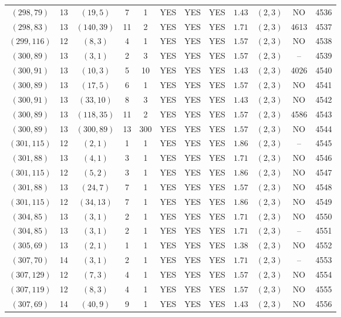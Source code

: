 \begin{longtable}{|c|c|c|c|c|c|c|c|c|c|c|c|}
$(298,79)$ & 13 & $(19,5)$ & 7 & 1 & YES & YES & YES & $1.43$ & $(2,3)$ & NO & 4536\\
$(298,83)$ & 13 & $(140,39)$ & 11 & 2 & YES & YES & YES & $1.71$ & $(2,3)$ & 4613 & 4537\\
$(299,116)$ & 12 & $(8,3)$ & 4 & 1 & YES & YES & YES & $1.57$ & $(2,3)$ & NO & 4538\\
$(300,89)$ & 13 & $(3,1)$ & 2 & 3 & YES & YES & YES & $1.57$ & $(2,3)$ & -- & 4539\\
$(300,91)$ & 13 & $(10,3)$ & 5 & 10 & YES & YES & YES & $1.43$ & $(2,3)$ & 4026 & 4540\\
$(300,89)$ & 13 & $(17,5)$ & 6 & 1 & YES & YES & YES & $1.57$ & $(2,3)$ & NO & 4541\\
$(300,91)$ & 13 & $(33,10)$ & 8 & 3 & YES & YES & YES & $1.43$ & $(2,3)$ & NO & 4542\\
$(300,89)$ & 13 & $(118,35)$ & 11 & 2 & YES & YES & YES & $1.57$ & $(2,3)$ & 4586 & 4543\\
$(300,89)$ & 13 & $(300,89)$ & 13 & 300 & YES & YES & YES & $1.57$ & $(2,3)$ & NO & 4544\\
$(301,115)$ & 12 & $(2,1)$ & 1 & 1 & YES & YES & YES & $1.86$ & $(2,3)$ & -- & 4545\\
$(301,88)$ & 13 & $(4,1)$ & 3 & 1 & YES & YES & YES & $1.71$ & $(2,3)$ & NO & 4546\\
$(301,115)$ & 12 & $(5,2)$ & 3 & 1 & YES & YES & YES & $1.86$ & $(2,3)$ & NO & 4547\\
$(301,88)$ & 13 & $(24,7)$ & 7 & 1 & YES & YES & YES & $1.57$ & $(2,3)$ & NO & 4548\\
$(301,115)$ & 12 & $(34,13)$ & 7 & 1 & YES & YES & YES & $1.86$ & $(2,3)$ & NO & 4549\\
$(304,85)$ & 13 & $(3,1)$ & 2 & 1 & YES & YES & YES & $1.71$ & $(2,3)$ & NO & 4550\\
$(304,85)$ & 13 & $(3,1)$ & 2 & 1 & YES & YES & YES & $1.71$ & $(2,3)$ & -- & 4551\\
$(305,69)$ & 13 & $(2,1)$ & 1 & 1 & YES & YES & YES & $1.38$ & $(2,3)$ & NO & 4552\\
$(307,70)$ & 14 & $(3,1)$ & 2 & 1 & YES & YES & YES & $1.71$ & $(2,3)$ & -- & 4553\\
$(307,129)$ & 12 & $(7,3)$ & 4 & 1 & YES & YES & YES & $1.57$ & $(2,3)$ & NO & 4554\\
$(307,119)$ & 12 & $(8,3)$ & 4 & 1 & YES & YES & YES & $1.57$ & $(2,3)$ & NO & 4555\\
$(307,69)$ & 14 & $(40,9)$ & 9 & 1 & YES & YES & YES & $1.43$ & $(2,3)$ & NO & 4556\\

\end{longtable}
